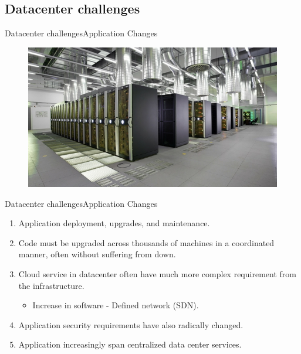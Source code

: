 \documentclass[10pt]{beamer}
\begin{document}
\subsection{Datacenter challenges}
\begin{frame}{Datacenter challenges}{Application Changes}
  \begin{figure}[ht]
    \centering
    \includegraphics[width=1\textwidth, keepaspectratio=true]{images/datacenter.jpg}
  \end{figure}
\end{frame}

\begin{frame}{Datacenter challenges}{Application Changes}
  \begin{enumerate}
    \item Application deployment, upgrades, and maintenance. \pause
    \item Code must be upgraded across thousands of machines in a coordinated
          manner, often without suffering from down. \pause
    \item Cloud service in datacenter often have much more complex requirement
          from the infrastructure. \pause
     \begin{itemize}
      \item Increase in software - Defined network (SDN). \pause
     \end{itemize}
    \item Application security requirements have also radically changed. \pause
    \item Application increasingly span centralized data center services.
  \end{enumerate}
\end{frame}
\end{document}
